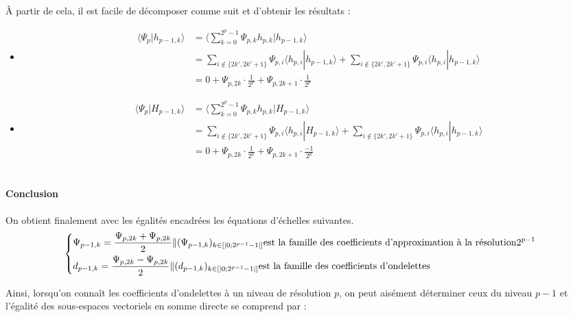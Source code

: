 \documentclass{article}
\begin{document}
\uppercase{à} partir de cela, il est facile de décomposer comme suit et d'obtenir les résultats :

\begin{itemize}
\item \begin{align*}\displaystyle \langle \Psi{}_{p}|h_{p-1,k}\rangle &=  \langle \sum_{k=0}^{2^{p}-1}\Psi{}_{p,k}h_{p,k}|h_{p-1,k}\rangle \\ &=  \sum_{i\notin{}\{2k',2k'+1\}}\Psi{}_{p,i}\langle{}h_{p,i}|h_{p-1,k}\rangle + \sum_{i\notin{}\{2k',2k'+1\}}\Psi{}_{p,i}\langle{}h_{p,i}|h_{p-1,k}\rangle  \\ 
&= 0 + \Psi{}_{p,2k}\cdot{}\frac{1}{2^p} + \Psi{}_{p,2k+1}\cdot{}\frac{1}{2^p} 
\end{align*} 

\item \begin{align*} \displaystyle \langle \Psi{}_{p}|H_{p-1,k}\rangle &= \langle \sum_{k=0}^{2^{p}-1}\Psi{}_{p,k}h_{p,k}|H_{p-1,k}\rangle \\ &= 
 \sum_{i\notin{}\{2k',2k'+1\}}\Psi{}_{p,i}\langle{}h_{p,i}|H_{p-1,k}\rangle + \sum_{i\notin{}\{2k',2k'+1\}}\Psi{}_{p,i}\langle{}h_{p,i}|h_{p-1,k}\rangle  \\ 
&= 0 + \Psi{}_{p,2k}\cdot{}\frac{1}{2^p} + \Psi{}_{p,2k+1}\cdot{}\frac{-1}{2^p}
\end{align*} \\


\end{itemize}

\paragraph{Conclusion}

On obtient finalement avec les égalités encadrées les équations d'échelles suivantes. \\

\[ \begin{dcases} \Psi{}_{p-1,k} = \frac{\Psi{}_{p,2k} + \Psi{}_{p,2k}}{2}  \| (\Psi{}_{p-1,k})_{k\in{}[|0;2^{p-1}-1|]} \text{est la famille des coefficients d'approximation à la résolution} 2^{p-1} \\ 
d_{p-1,k} = \frac{\Psi{}_{p,2k} - \Psi{}_{p,2k}}{2}  \| (d_{p-1,k})_{k\in{}[|0;2^{p-1}-1|]} \text{est la famille des coefficients d'ondelettes}
\end{dcases} \] 

Ainsi, lorsqu’on connaît les coefficients d’ondelettes à un niveau de résolution $p$, on peut aisément déterminer ceux du niveau $p-1$ et l’égalité des sous-espaces vectoriels en somme directe se comprend par :
\end{document}

